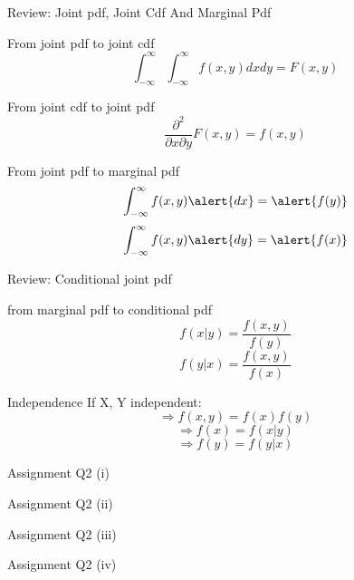 \documentclass{beamer}
\begin{document}
\begin{frame}{Review: Joint pdf, Joint Cdf And Marginal Pdf}
\begin{block}{From joint pdf to joint cdf}
    $$\int_{-\infty}^{\infty} \int_{-\infty}^{\infty} f(x,y)dxdy = F(x,y) $$
\end{block}
\begin{block}{From joint cdf to joint pdf}
    $$\frac{\partial ^2}{\partial x \partial y}F(x,y) = f(x,y)$$ 
\end{block}
\begin{block}{From joint pdf to marginal pdf}
    $$\int_{-\infty}^{\infty} f(x,y)\alert{dx} = \alert{f(y)}$$
    $$\int_{-\infty}^{\infty} f(x,y)\alert{dy} = \alert{f(x)}$$
\end{block}
\end{frame}

\begin{frame}{Review: Conditional joint pdf}
\begin{block}{from marginal pdf to conditional pdf}
    $$f(x|y) = \frac{f(x,y)}{f(y)}$$
    $$f(y|x) = \frac{f(x,y)}{f(x)}$$
\end{block}
\begin{block}{Independence}
    If X, Y independent:
    $$ \Rightarrow f(x,y) = f(x)f(y)$$
    $$ \Rightarrow f(x) = f(x|y)$$
    $$ \Rightarrow f(y) = f(y|x)$$
\end{block}
\end{frame}

\begin{frame}{Assignment Q2 (i)}
\end{frame}


\begin{frame}{Assignment Q2 (ii)}
\end{frame}


\begin{frame}{Assignment Q2 (iii)}
\end{frame}


\begin{frame}{Assignment Q2 (iv)}
\end{frame}
\end{document}
